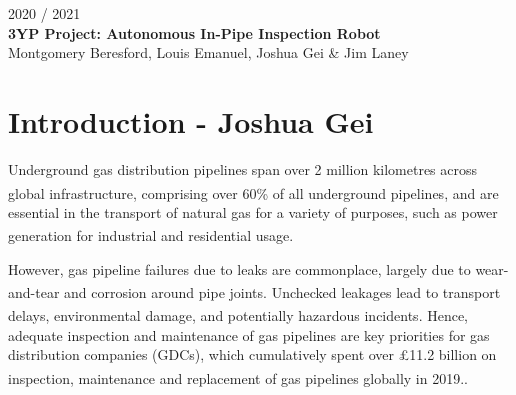 \documentclass[11pt]{article}		%
\newcommand{\supercite}[1]{\textsuperscript{\cite{#1}}}		%
\begin{document}
	
	\flushleft
	\raggedright

	\begin{center}
		\vspace*{2cm}
		2020 / 2021\\ %
		\vspace*{6cm}
		\huge{\textbf{3YP Project: Autonomous In-Pipe Inspection Robot}}\\ 
		\vspace*{6cm}
		\large{Montgomery Beresford, Louis Emanuel, Joshua Gei \& Jim Laney}
		\thispagestyle{empty} %
	\end{center}

	\newpage
	
	\pagestyle{empty}
	
	\setlength{\columnsep}{1.5cm} %
	\setlength{\columnseprule}{0.5pt} %
	
	\begin{multicols*}{2}
		\RaggedRight
	    \tableofcontents
    \end{multicols*}
	
	\setlength{\columnsep}{10pt} %
	\setlength{\columnseprule}{0pt} %
	
	\newpage
    \pagestyle{plain}
	\setcounter{page}{1}
	
	\section[Introduction]{Introduction - Joshua Gei}
	
		Underground gas distribution pipelines span over 2 million kilometres across global infrastructure, comprising over 60\% of all underground pipelines\supercite{sönnichsen_5_2021}, and are essential in the transport of natural gas for a variety of purposes, such as power generation for industrial and residential usage\supercite{group.met.com}. 
		
		However, gas pipeline failures due to leaks are commonplace, largely due to wear-and-tear and corrosion around pipe joints\supercite{corrosion1}. Unchecked leakages lead to transport delays, environmental damage, and potentially hazardous incidents\supercite{hazardousincidents}. Hence, adequate inspection and maintenance of gas pipelines are key priorities for gas distribution companies (GDCs), which cumulatively spent over £11.2 billion on inspection, maintenance  and replacement of gas pipelines globally in 2019.\supercite{ltd}. 
		
\end{document}
